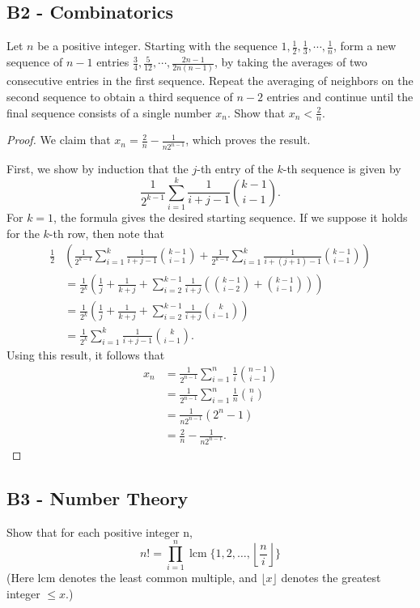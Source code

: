 \documentclass[11pt]{scrartcl}
\newcommand{\<}{\langle}
\renewcommand{\>}{\rangle}
\begin{document}
\subsection{B2 - Combinatorics} 
Let $n$ be a positive integer. Starting with the sequence $1,\frac{1}{2}, \frac{1}{3} , \cdots , \frac{1}{n}$, form a new sequence of $n -1$ entries $\frac{3}{4}, \frac{5}{12},\cdots ,\frac{2n -1}{2n(n -1)}$, by taking the averages of two consecutive entries in the first sequence. Repeat the averaging of neighbors on the second sequence to obtain a third sequence of $n -2$ entries and continue until the final sequence consists of a single number $x_n$. Show that $x_n < \frac{2}{n}$.
\begin{proof}
We claim that $x_n = \frac{2}{n} - \frac{1}{n2^{n-1}}$, which proves the result.   

First, we show by induction that the $j$-th entry of the $k$-th sequence is given by 
$$\frac{1}{2^{k-1}} \sum_{i=1}^{k} \frac{1}{i + j - 1} \binom{k-1}{i -1}.$$
For $k = 1$, the formula gives the desired starting sequence.  If we suppose it holds for the $k$-th row, then note that 
\begin{align*}
\frac{1}{2} &\left (\frac{1}{2^{k-1}} \sum_{i=1}^{k} \frac{1}{i + j - 1} \binom{k - 1}{i - 1} +  \frac{1}{2^{k-1}} \sum_{i=1}^{k} \frac{1}{i + (j + 1) - 1} \binom{k - 1}{i - 1} \right) \\
&= \frac{1}{2^k} \left (\frac{1}{j} + \frac{1}{k + j } + \sum_{i=2}^{k-1} \frac{1}{i + j } \left (\binom{k-1}{i-2} + \binom{k-1}{i-1} \right) \right) \\
&= \frac{1}{2^k} \left (\frac{1}{j} + \frac{1}{k + j } + \sum_{i=2}^{k-1} \frac{1}{i + j } \binom{k}{i-1}\right) \\
&= \frac{1}{2^k} \sum_{i=1}^{k} \frac{1}{i + j - 1 } \binom{k}{i-1}.
\end{align*}
Using this result, it follows that 
\begin{align*}
x_n &= \frac{1}{2^{n-1}} \sum_{i=1}^n \frac{1}{i} \binom{n-1}{i-1} \\
&= \frac{1}{2^{n-1}} \sum_{i=1}^n \frac{1}{n} \binom{n}{i} \\
&= \frac{1}{n2^{n-1}} (2^n - 1) \\
&= \frac{2}{n} - \frac{1}{n2^{n-1}}.
\end{align*}
\end{proof}
\pagebreak
\subsection{B3 - Number Theory}
Show that for each positive integer n,\[n!=\prod_{i=1}^n \; \text{lcm} \; \{1, 2, \ldots, \left\lfloor\frac{n}{i} \right\rfloor\}\](Here lcm denotes the least common multiple, and $\lfloor x\rfloor$ denotes the greatest integer $\le x$.)
\end{document}
